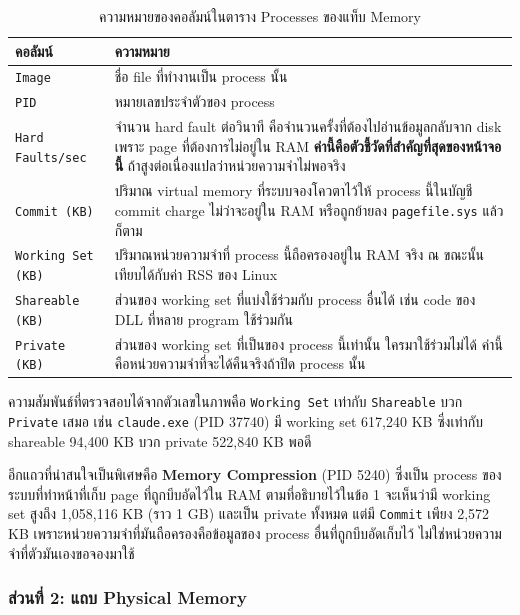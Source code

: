 \documentclass[a4paper,11pt]{article}
\newcommand{\code}[1]{\texttt{#1}}
\begin{document}
\begin{table}[H]
\centering\small
\caption{ความหมายของคอลัมน์ในตาราง Processes ของแท็บ Memory}
\begin{tabular}{@{}p{3.4cm}p{12.6cm}@{}}
\toprule
\textbf{คอลัมน์} & \textbf{ความหมาย} \\
\midrule
\code{Image} & ชื่อ file ที่ทำงานเป็น process นั้น \\
\code{PID} & หมายเลขประจำตัวของ process \\
\code{Hard Faults/sec} & จำนวน hard fault ต่อวินาที คือจำนวนครั้งที่ต้องไปอ่านข้อมูลกลับจาก disk เพราะ page ที่ต้องการไม่อยู่ใน RAM \textbf{ค่านี้คือตัวชี้วัดที่สำคัญที่สุดของหน้าจอนี้} ถ้าสูงต่อเนื่องแปลว่าหน่วยความจำไม่พอจริง \\
\code{Commit (KB)} & ปริมาณ virtual memory ที่ระบบจองโควตาไว้ให้ process นี้ในบัญชี commit charge ไม่ว่าจะอยู่ใน RAM หรือถูกย้ายลง \code{pagefile.sys} แล้วก็ตาม \\
\code{Working Set (KB)} & ปริมาณหน่วยความจำที่ process นี้ถือครองอยู่ใน RAM จริง ณ ขณะนั้น เทียบได้กับค่า RSS ของ Linux \\
\code{Shareable (KB)} & ส่วนของ working set ที่แบ่งใช้ร่วมกับ process อื่นได้ เช่น code ของ DLL ที่หลาย program ใช้ร่วมกัน \\
\code{Private (KB)} & ส่วนของ working set ที่เป็นของ process นี้เท่านั้น ใครมาใช้ร่วมไม่ได้ ค่านี้คือหน่วยความจำที่จะได้คืนจริงถ้าปิด process นั้น \\
\bottomrule
\end{tabular}
\end{table}

ความสัมพันธ์ที่ตรวจสอบได้จากตัวเลขในภาพคือ \code{Working Set} เท่ากับ \code{Shareable} บวก \code{Private} เสมอ เช่น \code{claude.exe} (PID 37740) มี working set 617{,}240 KB ซึ่งเท่ากับ shareable 94{,}400 KB บวก private 522{,}840 KB พอดี

อีกแถวที่น่าสนใจเป็นพิเศษคือ \textbf{Memory Compression} (PID 5240) ซึ่งเป็น process ของระบบที่ทำหน้าที่เก็บ page ที่ถูกบีบอัดไว้ใน RAM ตามที่อธิบายไว้ในข้อ 1 จะเห็นว่ามี working set สูงถึง 1{,}058{,}116 KB (ราว 1 GB) และเป็น private ทั้งหมด แต่มี \code{Commit} เพียง 2{,}572 KB เพราะหน่วยความจำที่มันถือครองคือข้อมูลของ process อื่นที่ถูกบีบอัดเก็บไว้ ไม่ใช่หน่วยความจำที่ตัวมันเองขอจองมาใช้

\subsubsection{ส่วนที่ 2: แถบ Physical Memory}
\end{document}
